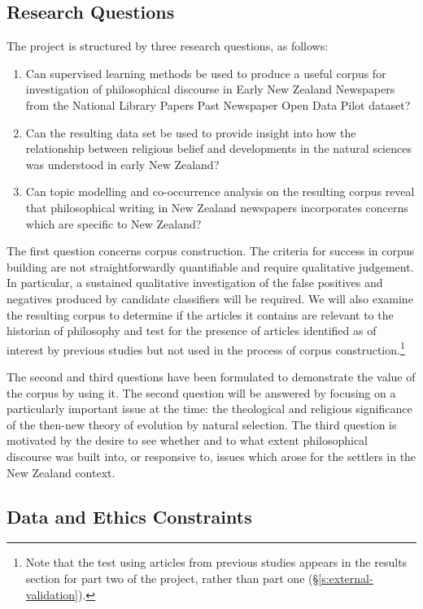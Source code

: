 \documentclass{article}
\begin{document}
\subsection{Research Questions}

The project is structured by three research questions, as follows:
\begin{enumerate}
  \item Can supervised learning methods be used to produce a useful corpus for investigation of philosophical discourse in Early New Zealand Newspapers from the National Library Papers Past Newspaper Open Data Pilot dataset?
  \item Can the resulting data set be used to provide insight into how the relationship between religious belief and developments in the natural sciences was understood in early New Zealand?
  \item Can topic modelling and co-occurrence analysis on the resulting corpus reveal that philosophical writing in New Zealand newspapers incorporates concerns which are specific to New Zealand?
\end{enumerate}

The first question concerns corpus construction. The criteria for success in corpus building are not straightforwardly quantifiable and require qualitative judgement. In particular, a sustained qualitative investigation of the false positives and negatives produced by candidate classifiers will be required.
We will also examine the resulting corpus to determine if the articles it contains are relevant to the historian of philosophy and test for the presence of articles identified as of interest by previous studies but not used in the process of corpus construction.\footnote{Note that the test using articles from previous studies appears in the results section for part two of the project, rather than part one (\S \ref{s:external-validation}).}

The second and third questions have been formulated to demonstrate the value of the corpus by using it. The second question will be answered by focusing on a particularly important issue at the time: the theological and religious significance of the then-new theory of evolution by natural selection. The third question is motivated by the desire to see whether and to what extent philosophical discourse was built into, or responsive to, issues which arose for the settlers in the New Zealand context.

\subsection{Data and Ethics Constraints}
\end{document}
